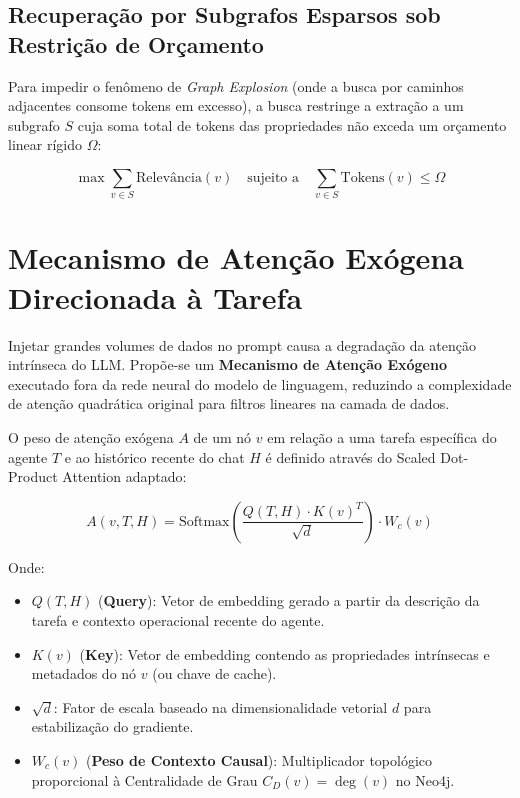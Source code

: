 \documentclass[11pt,a4paper]{article}
\begin{document}
\subsection{Recuperação por Subgrafos Esparsos sob Restrição de Orçamento}
Para impedir o fenômeno de \textit{Graph Explosion} (onde a busca por caminhos adjacentes consome tokens em excesso), a busca restringe a extração a um subgrafo $S$ cuja soma total de tokens das propriedades não exceda um orçamento linear rígido $\Omega$:

\begin{equation}
\max \sum_{v \in S} \text{Relevância}(v) \quad \text{sujeito a} \quad \sum_{v \in S} \text{Tokens}(v) \le \Omega
\end{equation}

\section{Mecanismo de Atenção Exógena Direcionada à Tarefa}

Injetar grandes volumes de dados no prompt causa a degradação da atenção intrínseca do LLM. Propõe-se um \textbf{Mecanismo de Atenção Exógeno} executado fora da rede neural do modelo de linguagem, reduzindo a complexidade de atenção quadrática original para filtros lineares na camada de dados.

O peso de atenção exógena $A$ de um nó $v$ em relação a uma tarefa específica do agente $T$ e ao histórico recente do chat $H$ é definido através do Scaled Dot-Product Attention adaptado:

\begin{equation}
A(v, T, H) = \text{Softmax} \left( \frac{Q(T, H) \cdot K(v)^T}{\sqrt{d}} \right) \cdot W_c(v)
\end{equation}

Onde:
\begin{itemize}
    \item $Q(T, H)$ (\textbf{Query}): Vetor de embedding gerado a partir da descrição da tarefa e contexto operacional recente do agente.
    \item $K(v)$ (\textbf{Key}): Vetor de embedding contendo as propriedades intrínsecas e metadados do nó $v$ (ou chave de cache).
    \item $\sqrt{d}$: Fator de escala baseado na dimensionalidade vetorial $d$ para estabilização do gradiente.
    \item $W_c(v)$ (\textbf{Peso de Contexto Causal}): Multiplicador topológico proporcional à Centralidade de Grau $C_D(v) = \deg(v)$ no Neo4j.
\end{itemize}
\end{document}
